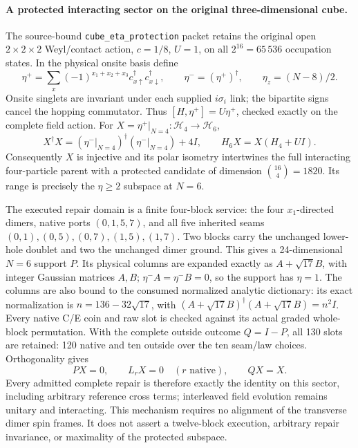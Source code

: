 \paragraph{A protected interacting sector on the original three-dimensional cube.}
The source-bound \texttt{cube\_eta\_protection} packet retains the original
open $2\times2\times2$ Weyl/contact action, $c=1/8$, $U=1$, on all
$2^{16}=65\,536$ occupation states. In the physical onsite basis define
\[
 \eta^+=\sum_x(-1)^{x_1+x_2+x_3}
 c^\dagger_{x\uparrow}c^\dagger_{x\downarrow},\qquad
 \eta^-=(\eta^+)^\dagger,\qquad \eta_z=(N-8)/2.
\]
Onsite singlets are invariant under each supplied $i\sigma_i$ link;
the bipartite signs cancel the hopping commutator. Thus
$[H,\eta^+]=U\eta^+$, checked exactly on the complete field action.
For $X=\eta^+|_{N=4}:\mathcal H_4\to\mathcal H_6$,
\[
 X^\dagger X=(\eta^-|_{N=4})^\dagger(\eta^-|_{N=4})+4I,
 \qquad H_6X=X(H_4+U I).
\]
Consequently $X$ is injective and its polar isometry intertwines the
full interacting four-particle parent with a protected candidate of
dimension $\binom{16}{4}=1820$. Its range is precisely the
$\eta\geq2$ subspace at $N=6$.

The executed repair domain is a finite four-block service: the four
$x_1$-directed dimers, native ports $(0,1,5,7)$, and all five inherited
seams $(0,1),(0,5),(0,7),(1,5),(1,7)$. Two blocks carry the unchanged
lower-hole doublet and two the unchanged dimer ground. This gives a
24-dimensional $N=6$ support $P$. Its physical columns are expanded
exactly as $A+\sqrt{17}B$, with integer Gaussian matrices $A,B$;
$\eta^-A=\eta^-B=0$, so the support has $\eta=1$.
The columns are also bound to the consumed normalized analytic
dictionary: its exact normalization is $n=136-32\sqrt{17}$, with
$(A+\sqrt{17}B)^\dagger(A+\sqrt{17}B)=n^2I$. Every native C/E coin and raw slot is checked against its
actual graded whole-block permutation. With the complete outside
outcome $Q=I-P$, all 130 slots are retained: 120 native and ten outside
over the ten seam/law choices. Orthogonality gives
\[
 PX=0,\qquad L_rX=0\quad(r\text{ native}),\qquad QX=X.
\]
Every admitted complete repair is therefore exactly the identity on
this sector, including arbitrary reference cross terms; interleaved
field evolution remains unitary and interacting. This mechanism
requires no alignment of the transverse dimer spin frames. It does
not assert a twelve-block execution, arbitrary repair invariance, or
maximality of the protected subspace.

